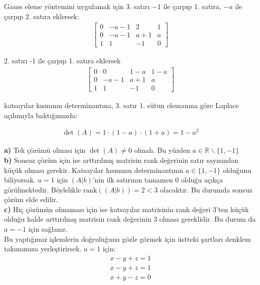 \documentclass{article}
\begin{document}
Gauss eleme yöntemini uygulamak için 3. satırı $-1$ ile çarpıp 1. satıra, $-a$ ile çarpıp 2. satıra eklersek: 
%
\begin{align}
\left[\begin{array}{ccc|c}
0 & -a-1 & 2  & 1 \\
0 & -a-1   & a+1  & a\\
1 &  1   & -1 & 0
\end{array}\right]
\end{align}

2. satırı -1 ile çarpıp 1. satıra eklersek
%
\begin{align}
\left[\begin{array}{ccc|c}
0 & 0      & 1-a  & 1-a \\
0 & -a-1   & a+1  & a\\
1 &  1   & -1 & 0
\end{array}\right]
\end{align}
%

katsayılar kısmının determinantına, 3. satır 1. sütun elemanına göre Laplace açılımıyla baktığımızda: 

\begin{align}
\det(A) = 1\cdot (1-a)\cdot (1+a) = 1 - a^2
\end{align}

\textbf{a)} Tek çözümü olması için $\det(A)\neq 0$ olmalı. Bu yüzden $a \in \mathbb{R} \backslash \{1,-1\}$ \\

\textbf{b)} Sonsuz çözüm için ise arttırılmış matrisin rank değerinin satır sayısından küçük olması gerekir. Katsayılar kısmının determinantının $a \in \{1,-1\}$ olduğunu biliyorsak. $a=1$ için $(A|b)$'nin ilk satırının tamamen 0 olduğu açıkça görülmektedir. Böylelikle $\text{rank}((A|b)) = 2<3$ olacaktır. Bu durumda sonsuz çözüm elde edilir.  \\

\textbf{c)} Hiç çözümün olmaması için ise katsayılar matrisinin rank değeri 3'ten küçük olduğu halde arttırılmış matrisin rank değerinin 3 olması gereklidir. Bu durum da  $a=-1$ için sağlanır. \\

Bu yaptığımız işlemlerin doğruluğunu gözle görmek için üstteki şartları denklem takımımıza yerleştirirsek. $a=1$ için:
$$
\begin{array}{l}
x - y +z = 1\\
x - y +z = 1 \\
x + y -z = 0 
\end{array} 
$$
\end{document}
